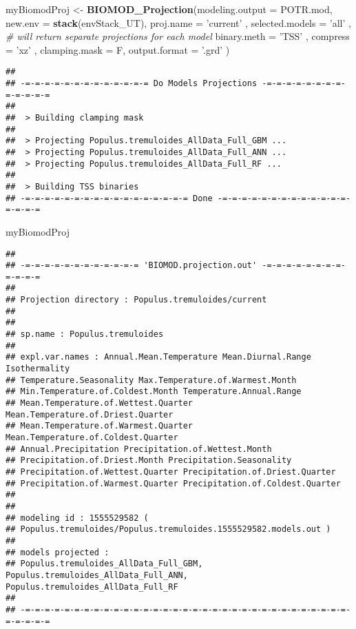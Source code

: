 \documentclass[]{article}
\newenvironment{Shaded}{\begin{snugshade}}{\end{snugshade}}
\newcommand{\KeywordTok}[1]{\textcolor[rgb]{0.13,0.29,0.53}{\textbf{#1}}}
\newcommand{\DataTypeTok}[1]{\textcolor[rgb]{0.13,0.29,0.53}{#1}}
\newcommand{\StringTok}[1]{\textcolor[rgb]{0.31,0.60,0.02}{#1}}
\newcommand{\CommentTok}[1]{\textcolor[rgb]{0.56,0.35,0.01}{\textit{#1}}}
\newcommand{\NormalTok}[1]{#1}
\begin{document}
\begin{Shaded}
\begin{Highlighting}[]
\NormalTok{myBiomodProj <-}\StringTok{ }\KeywordTok{BIOMOD_Projection}\NormalTok{(}\DataTypeTok{modeling.output =}\NormalTok{ POTR.mod,}
                    \DataTypeTok{new.env =} \KeywordTok{stack}\NormalTok{(envStack_UT),}
                    \DataTypeTok{proj.name =} \StringTok{'current'}\NormalTok{ ,}
                    \DataTypeTok{selected.models =} \StringTok{'all'}\NormalTok{ , }\CommentTok{# will return separate projections for each model }
                    \DataTypeTok{binary.meth =} \StringTok{'TSS'}\NormalTok{ ,}
                    \DataTypeTok{compress =} \StringTok{'xz'}\NormalTok{ ,}
                    \DataTypeTok{clamping.mask =}\NormalTok{ F,}
                    \DataTypeTok{output.format =} \StringTok{'.grd'}\NormalTok{ )}
\end{Highlighting}
\end{Shaded}

\begin{verbatim}
## 
## -=-=-=-=-=-=-=-=-=-=-=-=-= Do Models Projections -=-=-=-=-=-=-=-=-=-=-=-=-=
## 
##  > Building clamping mask
## 
##  > Projecting Populus.tremuloides_AllData_Full_GBM ...
##  > Projecting Populus.tremuloides_AllData_Full_ANN ...
##  > Projecting Populus.tremuloides_AllData_Full_RF ...
## 
##  > Building TSS binaries
## -=-=-=-=-=-=-=-=-=-=-=-=-=-=-=-=-= Done -=-=-=-=-=-=-=-=-=-=-=-=-=-=-=-=-=
\end{verbatim}

\begin{Shaded}
\begin{Highlighting}[]
\NormalTok{myBiomodProj}
\end{Highlighting}
\end{Shaded}

\begin{verbatim}
## 
## -=-=-=-=-=-=-=-=-=-=-=-= 'BIOMOD.projection.out' -=-=-=-=-=-=-=-=-=-=-=-=
## 
## Projection directory : Populus.tremuloides/current
## 
## 
## sp.name : Populus.tremuloides
## 
## expl.var.names : Annual.Mean.Temperature Mean.Diurnal.Range Isothermality 
## Temperature.Seasonality Max.Temperature.of.Warmest.Month 
## Min.Temperature.of.Coldest.Month Temperature.Annual.Range 
## Mean.Temperature.of.Wettest.Quarter Mean.Temperature.of.Driest.Quarter 
## Mean.Temperature.of.Warmest.Quarter Mean.Temperature.of.Coldest.Quarter 
## Annual.Precipitation Precipitation.of.Wettest.Month 
## Precipitation.of.Driest.Month Precipitation.Seasonality 
## Precipitation.of.Wettest.Quarter Precipitation.of.Driest.Quarter 
## Precipitation.of.Warmest.Quarter Precipitation.of.Coldest.Quarter
## 
## 
## modeling id : 1555529582 ( 
## Populus.tremuloides/Populus.tremuloides.1555529582.models.out )
## 
## models projected : 
## Populus.tremuloides_AllData_Full_GBM, Populus.tremuloides_AllData_Full_ANN, Populus.tremuloides_AllData_Full_RF
## 
## -=-=-=-=-=-=-=-=-=-=-=-=-=-=-=-=-=-=-=-=-=-=-=-=-=-=-=-=-=-=-=-=-=-=-=-=-=-=
\end{verbatim}
\end{document}
